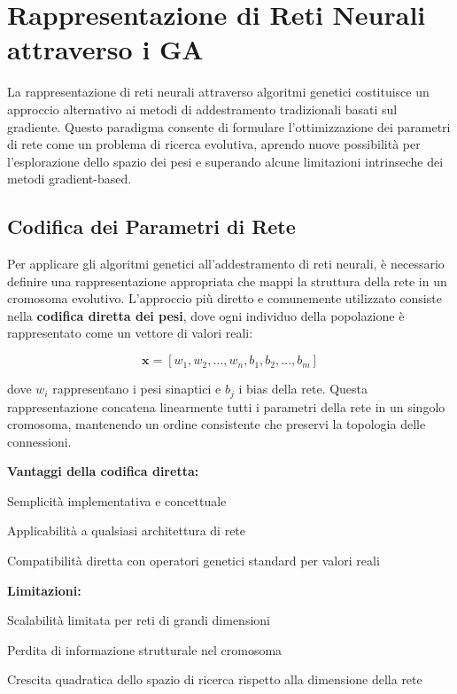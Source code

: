 \section{Rappresentazione di Reti Neurali attraverso i GA}
La rappresentazione di reti neurali attraverso algoritmi genetici costituisce un approccio alternativo ai metodi di addestramento tradizionali basati sul gradiente. Questo paradigma consente di formulare l'ottimizzazione dei parametri di rete come un problema di ricerca evolutiva, aprendo nuove possibilità per l'esplorazione dello spazio dei pesi e superando alcune limitazioni intrinseche dei metodi gradient-based.

\subsection{Codifica dei Parametri di Rete}
Per applicare gli algoritmi genetici all'addestramento di reti neurali, è necessario definire una rappresentazione appropriata che mappi la struttura della rete in un cromosoma evolutivo. L'approccio più diretto e comunemente utilizzato consiste nella \textbf{codifica diretta dei pesi}, dove ogni individuo della popolazione è rappresentato come un vettore di valori reali:

\[
\mathbf{x} = [w_1, w_2, \ldots, w_n, b_1, b_2, \ldots, b_m]
\]

dove $w_i$ rappresentano i pesi sinaptici e $b_j$ i bias della rete. Questa rappresentazione concatena linearmente tutti i parametri della rete in un singolo cromosoma, mantenendo un ordine consistente che preservi la topologia delle connessioni.

\textbf{Vantaggi della codifica diretta:}
\begin{compactitemize}
\item Semplicità implementativa e concettuale
\item Applicabilità a qualsiasi architettura di rete
\item Compatibilità diretta con operatori genetici standard per valori reali
\end{compactitemize}

\textbf{Limitazioni:}
\begin{compactitemize}
\item Scalabilità limitata per reti di grandi dimensioni
\item Perdita di informazione strutturale nel cromosoma
\item Crescita quadratica dello spazio di ricerca rispetto alla dimensione della rete
\end{compactitemize}


